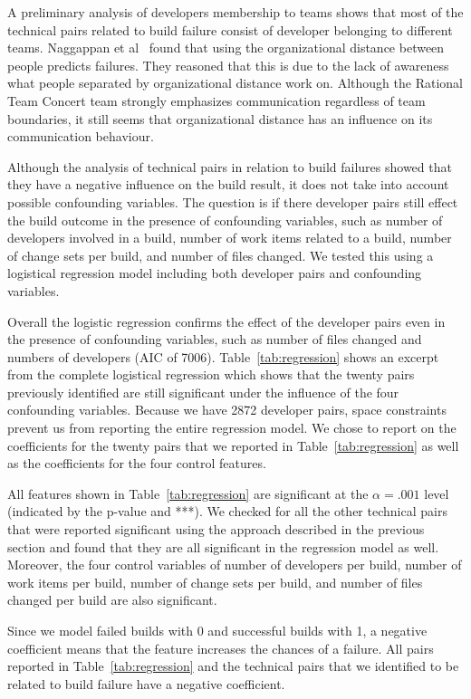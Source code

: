 A preliminary analysis of developers membership to teams shows that most
of the technical pairs related to build failure consist of developer belonging to
different teams. Naggappan et al~\cite{nagappan:icse:2008} found that using the
organizational distance between people predicts failures. They reasoned that this
is due to the lack of awareness what people separated by organizational distance
work on. Although the Rational Team Concert team strongly emphasizes communication
regardless of team boundaries, it still seems that organizational distance has
an influence on its communication behaviour.


Although the analysis of technical pairs in relation to build failures
showed that they have a negative influence on the build result, it does not take
into account possible confounding variables. The question is if there developer pairs still effect the build outcome in the presence of confounding variables, such as number of developers involved in a build, number of work items
related to a build, number of change sets per build, and number of files changed.
We tested this using a logistical regression model including both developer pairs and confounding variables.

Overall the logistic regression confirms the effect of the developer pairs
even in the presence of confounding variables, such as number of files changed
and numbers of developers (AIC of 7006). 
Table~\ref{tab:regression} shows an excerpt from the complete logistical
regression which shows that the twenty pairs previously identified are still
significant under the influence of the four confounding variables. Because we have 2872 developer pairs, space constraints prevent us from reporting the entire regression model. We chose to report on the coefficients for the twenty pairs that we reported in Table~\ref{tab:regression} as well as the coefficients for the four control features.

All features shown in Table~\ref{tab:regression} are significant at the $\alpha=.001$ level (indicated by the p-value and ***).
We checked for all the other technical pairs that were reported significant using the approach described in the previous section and found that they are all significant in the regression model as well.
Moreover, the four control variables of number of developers per build, number
of work items per build, number of change sets per build, and number of files changed per build are also significant.

Since we model failed builds with 0 and successful builds with 1, a negative coefficient means that the feature increases the chances of a failure.
All pairs reported in Table~\ref{tab:regression} and the technical pairs that we identified to be related to build failure have a negative coefficient.
 


